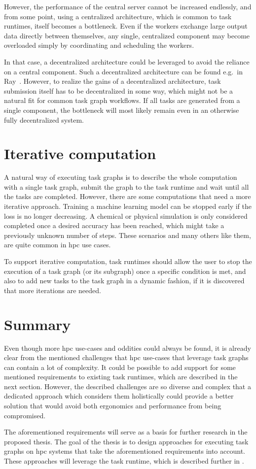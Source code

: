 \begin{description}
		However, the performance of the central server cannot be increased endlessly, and from some point,
		using a centralized architecture, which is common to task runtimes, itself becomes a bottleneck.
		Even if the workers exchange large output data directly between themselves, any single, centralized
		component may become overloaded simply by coordinating and scheduling the workers.

		In that case, a decentralized architecture could be leveraged to avoid the reliance on a central
		component. Such a decentralized architecture can be found e.g.\ in Ray~\cite{ray}.
		However, to realize the gains of a decentralized architecture, task submission itself has to be
		decentralized in some way, which might not be a natural fit for common task graph workflows. If all
		tasks are generated from a single component, the bottleneck will most likely remain even in an
		otherwise fully decentralized system.
\end{description}

\section{Iterative computation}
A natural way of executing task graphs is to describe the whole computation with a single task
graph, submit the graph to the task runtime and wait until all the tasks are completed. However,
there are some computations that need a more iterative approach. Training a machine learning model
can be stopped early if the loss is no longer decreasing. A chemical or physical simulation is only
considered completed once a desired accuracy has been reached, which might take a previously
unknown number of steps. These scenarios and many others like them, are quite common in
\gls{hpc} use cases.

To support iterative computation, task runtimes should allow the user to stop the execution of a
task graph (or its subgraph) once a specific condition is met, and also to add new tasks to the
task graph in a dynamic fashion, if it is discovered that more iterations are needed.

\section{Summary}
Even though more \gls{hpc} use-cases and oddities could always be found, it is
already clear from the mentioned challenges that \gls{hpc} use-cases that
leverage task graphs can contain a lot of complexity. It could be possible to add support for some
mentioned requirements to existing task runtimes, which are described in the next section. However,
the described challenges are so diverse and complex that a dedicated approach which considers them
holistically could provide a better solution that would avoid both ergonomics and performance from
being compromised.

The aforementioned requirements will serve as a basis for further research in the proposed thesis.
The goal of the thesis is to design approaches for executing task graphs on
\gls{hpc} systems that take the aforementioned requirements into account. These
approaches will leverage the \hyperqueue{} task runtime, which is described further
in .
